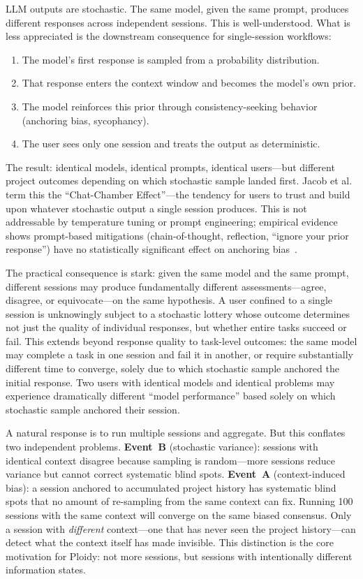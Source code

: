 \documentclass[11pt]{article}
\begin{document}
LLM outputs are stochastic. The same model, given the same prompt, produces different responses across independent sessions. This is well-understood. What is less appreciated is the downstream consequence for single-session workflows:

\begin{enumerate}[label=\arabic*.]
  \item The model's first response is sampled from a probability distribution.
  \item That response enters the context window and becomes the model's own prior.
  \item The model reinforces this prior through consistency-seeking behavior (anchoring bias, sycophancy).
  \item The user sees only one session and treats the output as deterministic.
\end{enumerate}

The result: identical models, identical prompts, identical users---but different project outcomes depending on which stochastic sample landed first. Jacob et al.~\citep{jacob2025chatchamber} term this the ``Chat-Chamber Effect''---the tendency for users to trust and build upon whatever stochastic output a single session produces. This is not addressable by temperature tuning or prompt engineering; empirical evidence shows prompt-based mitigations (chain-of-thought, reflection, ``ignore your prior response'') have no statistically significant effect on anchoring bias~\citep{feng2026anchoring}.

The practical consequence is stark: given the same model and the same prompt, different sessions may produce fundamentally different assessments---agree, disagree, or equivocate---on the same hypothesis. A user confined to a single session is unknowingly subject to a stochastic lottery whose outcome determines not just the quality of individual responses, but whether entire tasks succeed or fail. This extends beyond response quality to task-level outcomes: the same model may complete a task in one session and fail it in another, or require substantially different time to converge, solely due to which stochastic sample anchored the initial response. Two users with identical models and identical problems may experience dramatically different ``model performance'' based solely on which stochastic sample anchored their session.

A natural response is to run multiple sessions and aggregate. But this conflates two independent problems. \textbf{Event~B} (stochastic variance): sessions with identical context disagree because sampling is random---more sessions reduce variance but cannot correct systematic blind spots. \textbf{Event~A} (context-induced bias): a session anchored to accumulated project history has systematic blind spots that no amount of re-sampling from the same context can fix. Running 100 sessions with the same context will converge on the same biased consensus. Only a session with \emph{different} context---one that has never seen the project history---can detect what the context itself has made invisible. This distinction is the core motivation for Ploidy: not more sessions, but sessions with intentionally different information states.
\end{document}
